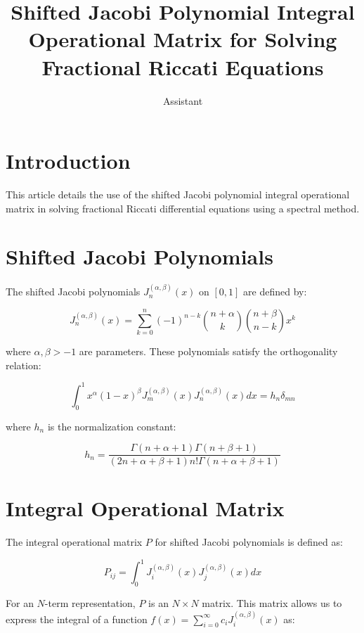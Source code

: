 \documentclass{article}
\title{Shifted Jacobi Polynomial Integral Operational Matrix for Solving Fractional Riccati Equations}
\author{Assistant}
\begin{document}
\maketitle

\section{Introduction}
This article details the use of the shifted Jacobi polynomial integral operational matrix in solving fractional Riccati differential equations using a spectral method.

\section{Shifted Jacobi Polynomials}
The shifted Jacobi polynomials $J_n^{(\alpha,\beta)}(x)$ on $[0,1]$ are defined by:

\begin{equation}
J_n^{(\alpha,\beta)}(x) = \sum_{k=0}^n (-1)^{n-k} \binom{n+\alpha}{k} \binom{n+\beta}{n-k} x^k
\end{equation}

where $\alpha, \beta > -1$ are parameters. These polynomials satisfy the orthogonality relation:

\begin{equation}
\int_0^1 x^\alpha (1-x)^\beta J_m^{(\alpha,\beta)}(x) J_n^{(\alpha,\beta)}(x) dx = h_n \delta_{mn}
\end{equation}

where $h_n$ is the normalization constant:

\begin{equation}
h_n = \frac{\Gamma(n+\alpha+1)\Gamma(n+\beta+1)}{(2n+\alpha+\beta+1)n!\Gamma(n+\alpha+\beta+1)}
\end{equation}

\section{Integral Operational Matrix}
The integral operational matrix $P$ for shifted Jacobi polynomials is defined as:

\begin{equation}
P_{ij} = \int_0^1 J_i^{(\alpha,\beta)}(x) J_j^{(\alpha,\beta)}(x) dx
\end{equation}

For an $N$-term representation, $P$ is an $N \times N$ matrix. This matrix allows us to express the integral of a function $f(x) = \sum_{i=0}^{\infty} c_i J_i^{(\alpha,\beta)}(x)$ as:
\end{document}

